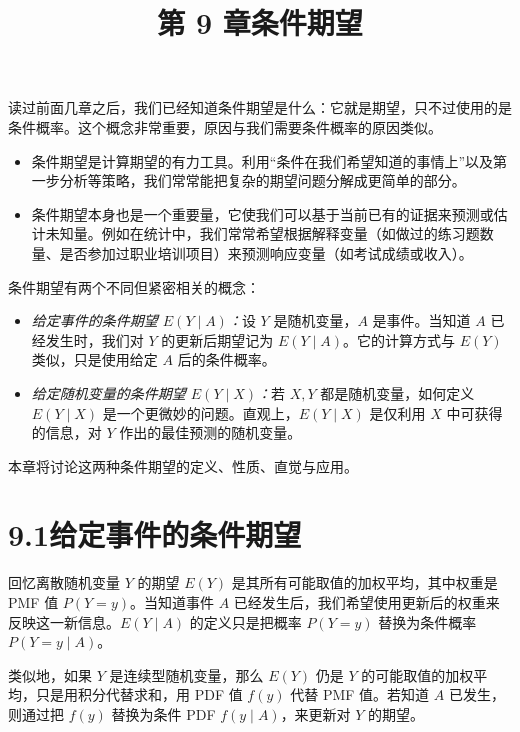\documentclass[UTF8, 12pt, fontset=fandol, oneside]{ctexart}
\title{第 9 章\quad 条件期望}
\author{}
\date{}
\begin{document}
\maketitle

读过前面几章之后，我们已经知道条件期望是什么：它就是期望，只不过使用的是条件概率。这个概念非常重要，原因与我们需要条件概率的原因类似。

\begin{itemize}
  \item 条件期望是计算期望的有力工具。利用“条件在我们希望知道的事情上”以及第一步分析等策略，我们常常能把复杂的期望问题分解成更简单的部分。

  \item 条件期望本身也是一个重要量，它使我们可以基于当前已有的证据来预测或估计未知量。例如在统计中，我们常常希望根据解释变量（如做过的练习题数量、是否参加过职业培训项目）来预测响应变量（如考试成绩或收入）。
\end{itemize}

条件期望有两个不同但紧密相关的概念：

\begin{itemize}
  \item \textit{给定事件的条件期望 $E(Y\mid A)$：}设 $Y$ 是随机变量，$A$ 是事件。当知道 $A$ 已经发生时，我们对 $Y$ 的更新后期望记为 $E(Y\mid A)$。它的计算方式与 $E(Y)$ 类似，只是使用给定 $A$ 后的条件概率。

  \item \textit{给定随机变量的条件期望 $E(Y\mid X)$：}若 $X,Y$ 都是随机变量，如何定义 $E(Y\mid X)$ 是一个更微妙的问题。直观上，$E(Y\mid X)$ 是仅利用 $X$ 中可获得的信息，对 $Y$ 作出的最佳预测的随机变量。
\end{itemize}

本章将讨论这两种条件期望的定义、性质、直觉与应用。

\section*{9.1\quad 给定事件的条件期望}

回忆离散随机变量 $Y$ 的期望 $E(Y)$ 是其所有可能取值的加权平均，其中权重是 PMF 值 $P(Y=y)$。当知道事件 $A$ 已经发生后，我们希望使用更新后的权重来反映这一新信息。$E(Y\mid A)$ 的定义只是把概率 $P(Y=y)$ 替换为条件概率 $P(Y=y\mid A)$。

类似地，如果 $Y$ 是连续型随机变量，那么 $E(Y)$ 仍是 $Y$ 的可能取值的加权平均，只是用积分代替求和，用 PDF 值 $f(y)$ 代替 PMF 值。若知道 $A$ 已发生，则通过把 $f(y)$ 替换为条件 PDF $f(y\mid A)$，来更新对 $Y$ 的期望。
\end{document}

